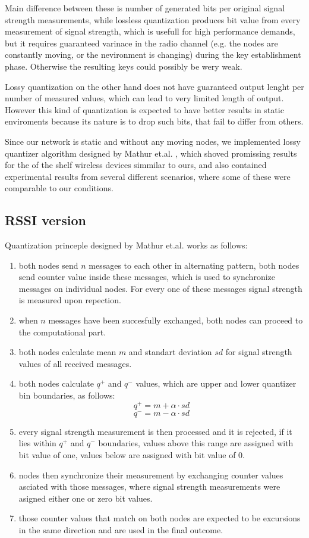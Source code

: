 \documentclass[
  digital, %
  table,   %
  nolof,     %
  nolot,     %
           oneside
]{fithesis3}
\begin{document}
    Main difference between these is number of generated bits per original signal strength measurements, while lossless quantization produces bit value from every measurement of signal strength, which is usefull for high performance demands, but it requires guaranteed varinace in the radio channel (e.g. the nodes are constantly moving, or the nevironment is changing) during the key establishment phase. %
    Otherwise the resulting keys could possibly be wery weak. %

    Lossy quantization on the other hand does not have guaranteed output lenght per number of measured values, which can lead to very limited length of output. However this kind of quantization is expected to have better results in static enviroments %
    because its nature is to drop such bits, that fail to differ from others.

    Since our network is static and without any moving nodes, we implemented lossy quantizer algorithm designed by Mathur et.al.%
    , which shoved promissing results for the of the shelf wireless devices simmilar to ours, and also contained experimental results from several different scenarios, where some of these were comparable to our conditions.

    \subsection{RSSI version}
    Quantization princeple designed by Mathur et.al. %
     works as follows:

    \begin{enumerate}
      \item both nodes send $n$ messages to each other in alternating pattern, both nodes send counter value inside these messages, which is used to synchronize messages on individual nodes. For every one of these messages signal strength is measured upon repection.
      \item when $n$ messages have been succesfully exchanged, both nodes can proceed to the computational part.
      \item both nodes calculate mean $m$ and standart deviation $sd$ for signal strength values of all received messages.
      \item both nodes calculate $q^+$ and $q^-$ values, which are upper and lower quantizer bin boundaries, as follows:
      $$q^+ = m + \alpha \cdot sd$$
      $$q^- = m - \alpha \cdot sd$$
      \item every signal strength measurement is then processed and it is rejected, if it lies within $q^+$ and $q^-$ boundaries, values above this range are assigned with bit value of one, values below are assigned with bit value of 0.
      \item nodes then synchronize their measurement by exchanging counter values asciated with those messages, where signal strength measurements were asigned either one or zero bit values.
      \item those counter values that match on both nodes are expected to be excursions in the same direction and are used in the final outcome.

    \end{enumerate}
\end{document}
